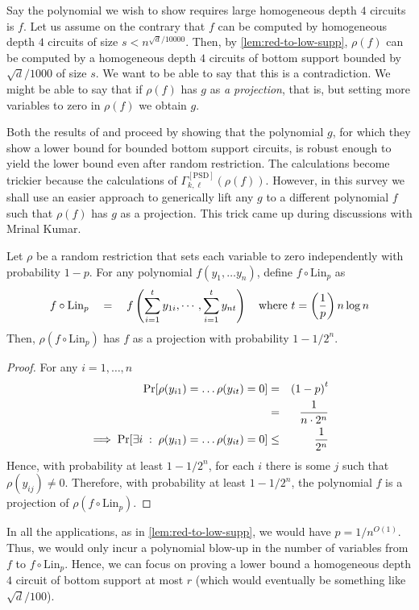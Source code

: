 Say the polynomial we wish to show requires large homogeneous depth $4$ circuits is $f$. 
Let us assume on the contrary that $f$ can be computed by homogeneous depth $4$ circuits of size $s < n^{\sqrt{d}/10000}$. 
Then, by \autoref{lem:red-to-low-supp}, $\rho(f)$ can be computed by a homogeneous depth $4$ circuits of bottom support bounded by $\sqrt{d}/1000$ of size $s$. 
We want to be able to say that this is a contradiction. 
We might be able to say that if $\rho(f)$ has $g$ as \emph{a projection}, that is, but setting more variables to zero in $\rho(f)$ we obtain $g$. 

Both the results of \cite{KLSS} and \cite{KS14} proceed by showing that the polynomial $g$, for which they show a lower bound for bounded bottom support circuits, is robust enough to yield the lower bound even after random restriction. 
The calculations become trickier because the calculations of $\Gamma^{[\mathrm{PSD}]}_{k,\ell}(\rho(f))$. 
However, in this survey we shall use an easier approach to generically lift any $g$ to a different polynomial $f$ such that $\rho(f)$ has $g$ as a projection. 
This trick came up during discussions with Mrinal Kumar. 

\begin{lemma}\label{lem:lin-transform-trick}
Let $\rho$ be a random restriction that sets each variable to zero independently with probability $1 - p$. 
For any polynomial $f(y_1,\dots y_n)$, define $f \circ \mathrm{Lin}_p$ as
\[
f \circ \mathrm{Lin}_p \quad = \quad f\left(\sum_{i=1}^t y_{1i}, \cdots, \sum_{i=1}^t y_{nt}\right)\quad \text{where $t = \left(\frac{1}{p}\right) n \log n$}
\]
Then, $\rho(f \circ \mathrm{Lin}_p)$ has $f$ as a projection with probability $1 - 1/2^{n}$. 
\end{lemma}
\begin{proof} For any $i = 1, \dots, n$
\begin{eqnarray*}
\quad \Pr[\rho(y_{i1}) = \dots \rho(y_{it}) = 0 ] & = & \left(1 - p\right)^t\\ 
& = & \frac{1}{n\cdot 2^n}\\
\implies \Pr[\exists i\;:\;\rho(y_{i1}) = \dots \rho(y_{it}) = 0 ]  & \leq  & \frac{1}{2^n} 
\end{eqnarray*}
Hence, with probability at least $1 - 1/2^n$, for each $i$ there is some $j$ such that $\rho(y_{ij}) \neq 0$. 
Therefore, with probability at least $1 - 1/2^n$, the polynomial $f$ is a projection of $\rho(f \circ \mathrm{Lin}_p)$. \end{proof}

In all the applications, as in \autoref{lem:red-to-low-supp}, we would have $p = 1/n^{O(1)}$. 
Thus, we would only incur a polynomial blow-up in the number of variables from $f$ to $f\circ \mathrm{Lin}_p$. 
Hence, we can focus on proving a lower bound  a homogeneous depth $4$ circuit of bottom support at most $r$ (which would eventually be something like $\sqrt{d}/100$). 

